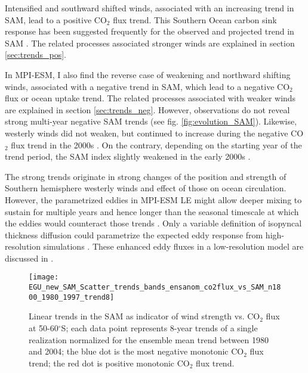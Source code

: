 Intensified and southward shifted winds, associated with an increasing trend in \acs{SAM}, lead to a positive CO$_2$ flux trend. This Southern Ocean carbon sink response has been suggested frequently for the observed and projected trend in \acs{SAM} \citep{LeQuere2007,Lovenduski2007,Lovenduski2008,Hauck2013}. The related processes associated stronger winds are explained in section \ref{sec:trends_pos}.

In \acs{MPI-ESM}, I also find the reverse case of weakening and northward shifting winds, associated with a negative trend in \acs{SAM}, which lead to a negative CO$_2$ flux or ocean uptake trend. The related processes associated with weaker winds are explained in section \ref{sec:trends_neg}. However, observations do not reveal strong multi-year negative \acs{SAM} trends (see fig. \ref{fig:evolution_SAM}). Likewise, westerly winds did not weaken, but continued to increase during the negative CO$_2$ flux trend in the 2000s \citep{landschuetzer2015}. On the contrary, depending on the starting year of the trend period, the \acs{SAM} index slightly weakened in the early 2000s \citep{Marshall2003,Lovenduski2015}. \newline

The strong trends originate in strong changes of the position and strength of Southern hemisphere westerly winds and effect of those on ocean circulation. However, the parametrized eddies in \acs{MPI-ESM LE} might allow deeper mixing to sustain for multiple years and hence longer than the seasonal timescale at which the eddies would counteract those trends \citep{Thompson2011}. Only a variable definition of isopyncal thickness diffusion could parametrize the expected eddy response from high-resolution simulations \citep{Gent2011}. These enhanced eddy fluxes in a low-resolution model are discussed in \cite{Lovenduski2013}.


\begin{figure}[h!]
\centering
		\texttt{[image: EGU\_new\_SAM\_Scatter\_trends\_bands\_ensanom\_co2flux\_vs\_SAM\_n1800\_1980\_1997\_trend8]}
		
		\vspace{-2mm}
		\caption{Linear trends in the \ac{SAM} as indicator of wind strength vs. CO$_2$ flux at 50-60$^\circ$S; each data point represents 8-year trends of a single realization normalized for the ensemble mean trend  between 1980 and 2004; the blue dot is the most negative monotonic CO$_2$ flux trend; the red dot is positive monotonic CO$_2$ flux trend.}
		\label{fig:scatter}
\end{figure}

